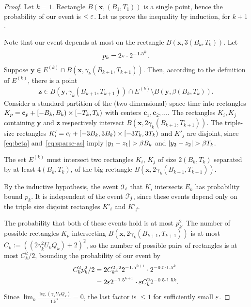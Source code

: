 \documentclass[11pt]{memoir}
\theoremstyle{definition} %
\renewcommand{\le}{\leq}
\renewcommand{\vek}[1]{\mathbf{#1}}
\def\B{B}
\def\U{U}
\newcommand{\Q}{Q}
\newcommand{\Tu}{T}
\begin{document}
\begin{proof}
Let \( k=1 \).
Rectangle \( B(\vek{x},(\B_{1}, \Tu_{1})) \) is a single point, hence
the probability of our event is \( <\varepsilon \).
Let us prove the inequality by induction, for \( k+1 \).

Note that our 
event depends at most on the rectangle \( B(\vek{x},3(\B_{k}, \Tu_{k})) \).
Let
\begin{align*}
   p_{k}=2\varepsilon\cdot 2^{-1.5^{k}}.
\end{align*}
Suppose \( \vek{y} \in E^{(k)}\cap B(\vek{x},\gamma_{k}(\B_{k+1}, \Tu_{k+1})  ) \).
Then, according to the definition of \( E^{(k)} \),  there is a point
\begin{align}\label{eq:sparse-as}
 \vek{z} \in
 B(\vek{y},\gamma_{k}(\B_{k+1},\Tu_{k+1}))\cap E^{(k)}\setminus B(\vek{y},\beta(\B_{k}, \Tu_{k})).
 \end{align}
Consider a standard partition of the (two-dimensional) space-time into
rectangles \( K_{p}=\vek{c}_{p}+\lint{-\B_{k}}{\B_{k}}\times \lint{-\Tu_{k}}{\Tu_{k}} \)
with centers \( \vek{c}_{1},\vek{c}_{2},\dots \).
The rectangles \( K_{i},K_{j} \) containing \( \vek{y} \) and \( \vek{z} \)
respectively intersect \( B(\vek{x}, 2\gamma_{k}(\B_{k+1}, \Tu_{k+1})) \).
The triple-size rectangles 
\( K'_{i}=c_{i} + \lint{-3\B_{k}}{3\B_{k}}\times \lint{-3\Tu_{k}}{3\Tu_{k}} \) and
\( K'_{j} \) are disjoint, since \eqref{eq:beta} and~\eqref{eq:sparse-as} imply
 \( \abs{y_{1} - z_{1}}>\beta\B_{k} \) and \( \abs{y_{2} - z_{2}}>\beta\Tu_{k} \).

The set \( E^{(k)} \) must intersect two rectangles \( K_{i} \),
\( K_{j} \) of size \( 2(\B_{k}, \Tu_{k}) \) separated by at least \( 4(\B_{k}, \Tu_{k}) \),
of the big rectangle \( B(\vek{x},2\gamma_{k}(\B_{k+1}, \Tu_{k+1})) \).

By the inductive hypothesis, the event \( \mathcal{F}_{i} \) that
\( K_{i} \) intersects \( E_{k} \) has probability bound \( p_{k} \).
It is independent of the event \( \mathcal{F}_{j} \), since these events depend
only on the triple size disjoint rectangles \( K'_{i} \) and \( K'_{j} \).

The probability that both of these events hold is at most \( p_{k}^{2} \).
The number of possible rectangles
\( K_{p} \) intersecting \( B(\vek{x},2\gamma_{k}(\B_{k+1}, \Tu_{k+1})) \) is
at most
\( C_{k}:=((2\gamma_{k}^{2}\U_{k} \Q_{k})+2)^{2} \), so the number of possible pairs of rectangles
is at most \( C_{k}^{2}/2 \), bounding the probability of our event by
 \begin{align*}
   C_{k}^{2}p_{k}^{2}/2
    &=
      2 C_{k}^{2}\varepsilon^{2} 2^{-1.5^{k+1}}\cdot 2^{-0.5\cdot 1.5^{k}}
   \\ &=2\varepsilon 2^{-1.5^{k+1}} \cdot \varepsilon
        C_{k}^{2}2^{-0.5\cdot 1.5{k}}.
 \end{align*}
Since \( \lim_{k}\frac{\log{(\gamma_{k}\U_{k} \Q_{k})}}{1.5^k}=0 \),
the last factor is \( \le 1 \) for sufficiently small  \( \varepsilon \).
\end{proof}
\end{document}
